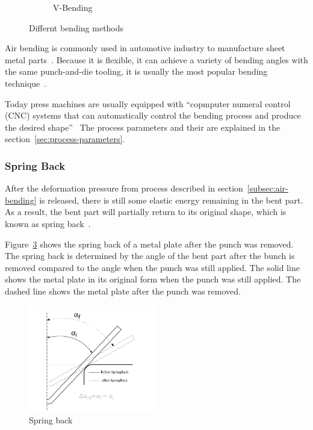 \begin{figure}[h]
\begin{tcolorbox}[arc=0pt,boxrule=0.5pt, colback=white]
\begin{subfigure}{0.3\textwidth}
            \caption{V-Bending}
            \label{fig:v-bending}
        \end{subfigure}
        \hfill
    \end{tcolorbox}
    \caption{Differnt bending methods~\cite[pp. 416]{groover_fundamentalsmodernmanufacturing_2020}}
    \label{fig:bending-methods}
\end{figure}

Air bending is commonly used in automotive industry to manufacture sheet metal
parts~\cite[p. 342]{kim_predictionbendallowance_2007}.
Because it is flexible, it can achieve a variety of bending angles with the same punch-and-die tooling, it
is usually the most popular bending
technique~\cite[p. 3]{miranda_formingspringbackprediction_2018}\cite[p. 1]{cruz_applicationmachinelearning_2021}.

Today press machines are usually equipped with ``copmputer numeral control (CNC) systems that can automatically
control the bending process and
produce the desired shape''~\cite[p. 3]{miranda_formingspringbackprediction_2018}
The process parameters and their are explained in the section~\ref{sec:process-parameters}.

\subsubsection{Spring Back}\label{sec:spring-back}
After the deformation pressure from process described in section~\ref{subsec:air-bending} is released, there is still
some elastic energy remaining in the bent part.
As a result, the bent part will partially return to its original
shape, which is known as spring back~\cite[p. 413--414]{groover_fundamentalsmodernmanufacturing_2020}.

Figure~\ref{fig:spring-back} shows the spring back of a metal plate after the punch was removed.
The spring back is determined by the angle of the bent part after the bunch is removed compared to the angle when
the punch was still applied.
The solid line shows the metal plate in its original form when the punch was still
applied. The dashed line shows the metal plate after the punch was removed.

\begin{figure}[ht]
    \centering
    \includegraphics[width=0.5\textwidth]{chap3/images/spring-back}
    \caption{Spring back~\cite[p. 5]{cruz_applicationmachinelearning_2021}}
    \label{fig:spring-back}
\end{figure}


